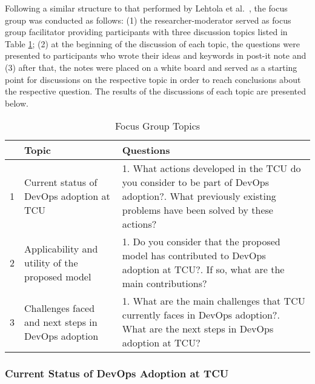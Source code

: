 {Following a similar structure to that performed by Lehtola et al.~\cite{requirementes_priorization_in_practice},
the focus group was conducted as follows: (1) the researcher-moderator served as
focus group facilitator providing participants with three discussion topics
listed in Table \ref{table_topics}; (2) at the beginning of the discussion of each topic, the
questions were presented to participants who wrote their ideas and keywords in
post-it note and (3) after that, the notes were placed on a white board and served
as a starting point for discussions on the respective topic in order to reach
conclusions about the respective question. The results of the discussions of
each topic are presented below.

\begin{table}[hb!]
\centering
\label{table_topics}
\begin{tabular}{|p{0.2cm}|p{3.4cm}|p{10cm}|} \hline
& \textbf{Topic} & \textbf{Questions} \\ \hline

1 & Current status of DevOps adoption at TCU &
1. What actions developed in the TCU do you consider to be part of DevOps adoption?\newline\newline
2. What previously existing problems have been solved by these actions? \\ \hline

2 & Applicability and utility of the proposed model &
1. Do you consider that the proposed model has contributed to DevOps adoption at TCU?\newline\newline
2. If so, what are the main contributions? \\ \hline

3 & Challenges faced and next steps in DevOps adoption &
1. What are the main challenges that TCU currently faces in DevOps adoption?\newline\newline
2. What are the next steps in DevOps adoption at TCU?\\ \hline

\end{tabular}
\caption{Focus Group Topics}
\end{table}
}

\subsubsection{Current Status of DevOps Adoption at TCU}

